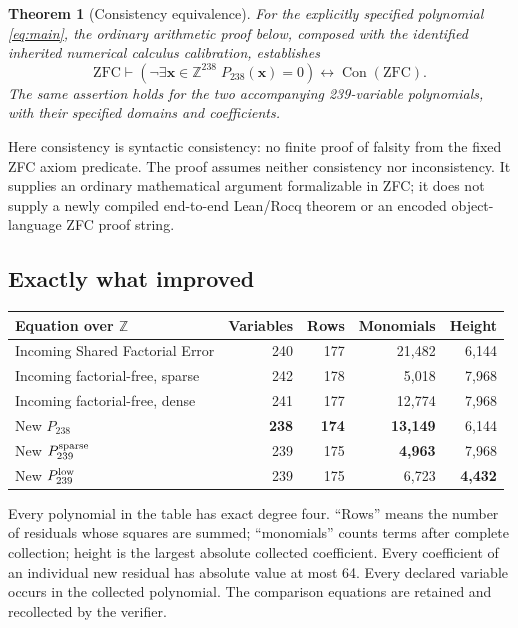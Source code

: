 \documentclass[11pt]{article}
\newtheorem{theorem}{Theorem}[section]
\newcommand{\Con}{\operatorname{Con}}
\begin{document}
\begin{theorem}[Consistency equivalence]\label{thm:main}
For the explicitly specified polynomial \eqref{eq:main}, the ordinary
arithmetic proof below, composed with the identified inherited numerical
calculus calibration, establishes
\[
 \mathrm{ZFC}\vdash
 \left(\neg\exists\boldsymbol x\in\mathbb Z^{238}\;
                 P_{238}(\boldsymbol x)=0\right)
 \longleftrightarrow\Con(\mathrm{ZFC}).
\]
The same assertion holds for the two accompanying 239-variable
polynomials, with their specified domains and coefficients.
\end{theorem}

Here consistency is syntactic consistency: no finite proof of falsity from
the fixed ZFC axiom predicate. The proof assumes neither consistency nor
inconsistency. It supplies an ordinary mathematical argument formalizable
in ZFC; it does not supply a newly compiled end-to-end Lean/Rocq theorem
or an encoded object-language ZFC proof string.

\subsection{Exactly what improved}

\begin{center}\small
\begin{tabular}{lrrrr}
\toprule
Equation over $\mathbb Z$ & Variables & Rows & Monomials & Height\\
\midrule
Incoming Shared Factorial Error &240&177&21,482&6,144\\
Incoming factorial-free, sparse &242&178&5,018&7,968\\
Incoming factorial-free, dense &241&177&12,774&7,968\\
\midrule
New $P_{238}$ &\textbf{238}&\textbf{174}&\textbf{13,149}&6,144\\
New $P_{239}^{\rm sparse}$ &239&175&\textbf{4,963}&7,968\\
New $P_{239}^{\rm low}$ &239&175&6,723&\textbf{4,432}\\
\bottomrule
\end{tabular}
\end{center}

Every polynomial in the table has exact degree four. ``Rows'' means the
number of residuals whose squares are summed; ``monomials'' counts terms
after complete collection; height is the largest absolute collected
coefficient. Every coefficient of an individual new residual has absolute
value at most 64. Every declared variable occurs in the collected polynomial.
The comparison equations are retained and recollected by the verifier.
\end{document}
